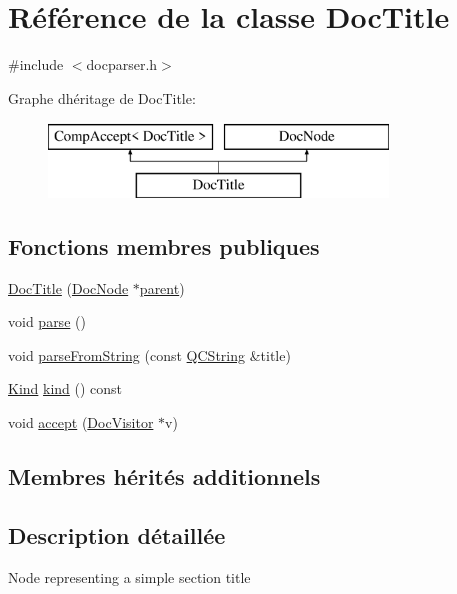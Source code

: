 \hypertarget{class_doc_title}{}\section{Référence de la classe Doc\+Title}
\label{class_doc_title}


{\ttfamily \#include $<$docparser.\+h$>$}

Graphe d\textquotesingle{}héritage de Doc\+Title\+:\begin{figure}[H]
\begin{center}
\leavevmode
\includegraphics[height=2.000000cm]{class_doc_title}
\end{center}
\end{figure}
\subsection*{Fonctions membres publiques}
\begin{DoxyCompactItemize}
\item 
\hyperlink{class_doc_title_ace782e46c09c599ad975debb7bdd2480}{Doc\+Title} (\hyperlink{class_doc_node}{Doc\+Node} $\ast$\hyperlink{class_doc_node_a990d8b983962776a647e6231d38bd329}{parent})
\item 
void \hyperlink{class_doc_title_a12306a4f4de4310c8201fac9d29eb627}{parse} ()
\item 
void \hyperlink{class_doc_title_a873047fb25268ec576389256f88b2bcf}{parse\+From\+String} (const \hyperlink{class_q_c_string}{Q\+C\+String} \&title)
\item 
\hyperlink{class_doc_node_aebd16e89ca590d84cbd40543ea5faadb}{Kind} \hyperlink{class_doc_title_a11ac976faab4d0bdb64ca1c802792ba9}{kind} () const 
\item 
void \hyperlink{class_doc_title_a364fe0325e849a4ca80318e0336a3244}{accept} (\hyperlink{class_doc_visitor}{Doc\+Visitor} $\ast$v)
\end{DoxyCompactItemize}
\subsection*{Membres hérités additionnels}


\subsection{Description détaillée}
Node representing a simple section title 

